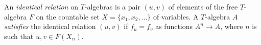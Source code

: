 An \emph{identical relation} on $T$-algebras is a pair $(u, v)$ of elements of the free $T$-algebra $F$ on the countable set $X = \{x_1, x_2, \ldots\}$ of variables. A $T$-algebra $A$ \emph{satisfies} the identical relation $(u, v)$ if $f_u = f_v$ as functions $A^n \to A$, where $n$ is such that $u, v \in F(X_n)$.
